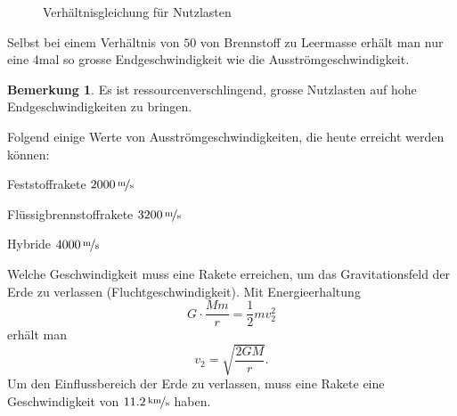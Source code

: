 \documentclass[%
11pt,%
twoside,%
titlepage,%
swissgerman,%
headsepline%
]{scrartcl}
\theoremstyle{definition}
\newtheorem{bem}{Bemerkung}[section] %
\theoremstyle{plain}
\begin{document}
\begin{figure}
\begin{center}
\end{center}
\caption{Verhältnisgleichung für Nutzlasten}\label{raketeverhaeltnis}
\end{figure}

Selbst bei einem Verhältnis von $50$ von Brennstoff zu Leermasse erhält man nur eine $4$mal so grosse Endgeschwindigkeit wie die Ausströmgeschwindigkeit.

\begin{bem}
Es ist ressourcenverschlingend, grosse Nutzlasten auf hohe Endgeschwindigkeiten zu bringen.
\end{bem}

Folgend einige Werte von Ausströmgeschwindigkeiten, die heute erreicht werden können:
\begin{description}
\item Feststoffrakete  $\unitfrac[2000]{m}{s}$
\item Flüssigbrennstoffrakete  $\unitfrac[3200]{m}{s}$
\item Hybride  $\unitfrac[4000]{m}{s}$
\end{description}

Welche Geschwindigkeit muss eine Rakete erreichen, um das Gravitationsfeld der Erde zu verlassen (Fluchtgeschwindigkeit). Mit Energieerhaltung
$$G\cdot\frac{Mm}{r}=\frac{1}{2}mv_2^2$$
erhält man
$$v_2=\sqrt{\frac{2GM}{r}}.$$
Um den Einflussbereich der Erde zu verlassen, muss eine Rakete eine Geschwindigkeit von $\unitfrac[11.2]{km}{s}$ haben.
\end{document}
